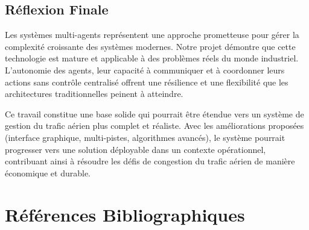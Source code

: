 \documentclass[12pt,a4paper]{article}
\begin{document}
\subsection{Réflexion Finale}

Les systèmes multi-agents représentent une approche prometteuse pour gérer la complexité croissante des systèmes modernes. Notre projet démontre que cette technologie est mature et applicable à des problèmes réels du monde industriel. L'autonomie des agents, leur capacité à communiquer et à coordonner leurs actions sans contrôle centralisé offrent une résilience et une flexibilité que les architectures traditionnelles peinent à atteindre.

Ce travail constitue une base solide qui pourrait être étendue vers un système de gestion du trafic aérien plus complet et réaliste. Avec les améliorations proposées (interface graphique, multi-pistes, algorithmes avancés), le système pourrait progresser vers une solution déployable dans un contexte opérationnel, contribuant ainsi à résoudre les défis de congestion du trafic aérien de manière économique et durable.

\section*{Références Bibliographiques}
\end{document}
